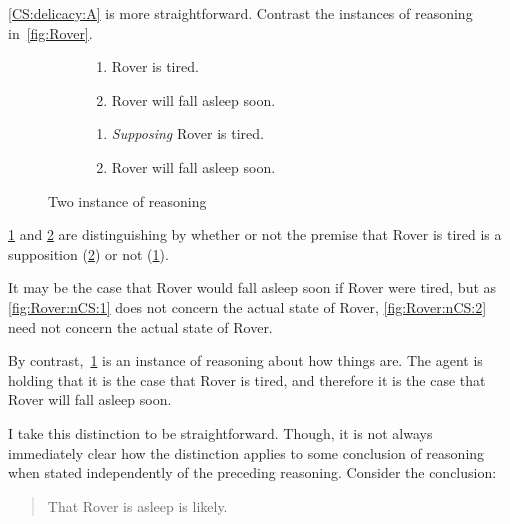 \begin{note}[Suppositions]
  \ref{CS:delicacy:A} is more straightforward.
  Contrast the instances of reasoning in~\autoref{fig:Rover}.
  \begin{figure}[h!]
    \mbox{}\hfill
    \begin{subfigure}{0.45\linewidth}
      \begin{enumerate}
      \item
        \label{fig:Rover:CS:1}
        Rover is tired.
      \item
        \label{fig:Rover:CS:2}
        Rover will fall asleep soon.
      \end{enumerate}
      \caption{}
      \label{fig:Rover:CS}
    \end{subfigure}
    \hfill
    \begin{subfigure}{0.45\linewidth}
      \begin{enumerate}[label=\arabic*\('\).,ref=(\arabic*\('\))]
      \item
        \label{fig:Rover:nCS:1}
        \emph{Supposing} Rover is tired.
      \item
        \label{fig:Rover:nCS:2}
        Rover will fall asleep soon.
      \end{enumerate}
      \caption{}
      \label{fig:Rover:nCS}
    \end{subfigure}
    \hfill\mbox{}
    \caption{Two instance of reasoning}
    \label{fig:Rover}
  \end{figure}

  \ref{fig:Rover:CS} and \ref{fig:Rover:nCS} are distinguishing by whether or not the premise that Rover is tired is a supposition (\ref{fig:Rover:nCS}) or not (\ref{fig:Rover:CS}).

  It may be the case that Rover would fall asleep soon if Rover were tired, but as \ref{fig:Rover:nCS:1} does not concern the actual state of Rover, \ref{fig:Rover:nCS:2} need not concern the actual state of Rover.

  By contrast,~\ref{fig:Rover:CS} is an instance of reasoning about how things are.
  The agent is holding that it is the case that Rover is tired, and therefore it is the case that Rover will fall asleep soon.

  I take this distinction to be straightforward.
  Though, it is not always immediately clear how the distinction applies to some conclusion of reasoning when stated independently of the preceding reasoning.
  Consider the conclusion:

  \begin{quote}
    That Rover is asleep is likely.
  \end{quote}


\end{note}
